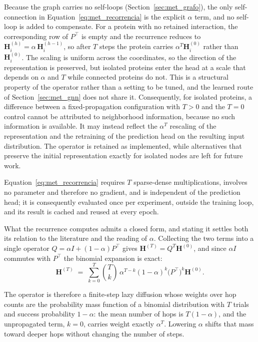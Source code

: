 \documentclass[Ingles]{ic-tese-v3}
\begin{document}
Because the graph carries no self-loops (Section~\ref{sec:met_grafo}), the only self-connection in
Equation~\eqref{eq:met_recorrencia} is the explicit $\alpha$ term, and no self-loop is added to
compensate. For a protein with no retained interaction, the corresponding row of $P^{\top}$ is empty
and the recurrence reduces to $\mathbf{H}^{(h)}_i = \alpha\, \mathbf{H}^{(h-1)}_i$, so after $T$
steps the protein carries $\alpha^{T}\mathbf{H}^{(0)}_i$ rather than $\mathbf{H}^{(0)}_i$. The
scaling is uniform across the coordinates, so the direction of the representation is preserved,
but isolated proteins enter the head at a scale that depends on $\alpha$ and $T$ while connected
proteins do not. This is a structural property of the operator rather than a setting to be tuned,
and the learned route of Section~\ref{sec:met_gnn} does not share it. Consequently, for isolated proteins, a difference between a fixed-propagation configuration with $T > 0$ and the $T = 0$ control cannot be attributed to neighborhood information, because no such information is available. It may instead reflect the $\alpha^{T}$ rescaling of the representation and the retraining of the prediction head on the resulting input distribution. The operator is retained as implemented, while alternatives that preserve the initial representation exactly for isolated nodes are left for future work.


Equation~\eqref{eq:met_recorrencia} requires $T$ sparse-dense multiplications, involves no
parameter and therefore no gradient, and is independent of the prediction head; it is consequently
evaluated once per experiment, outside the training loop, and its result is cached and reused at
every epoch.

What the recurrence computes admits a closed form, and stating it settles both its relation to the
literature and the reading of $\alpha$. Collecting the two terms into a single operator
$Q = \alpha I + (1-\alpha) P^{\top}$ gives $\mathbf{H}^{(T)} = Q^{T} \mathbf{H}^{(0)}$, and since
$\alpha I$ commutes with $P^{\top}$ the binomial expansion is exact:
\begin{equation}
  \mathbf{H}^{(T)} \;=\; \sum_{k=0}^{T} \binom{T}{k}\, \alpha^{T-k} (1-\alpha)^{k}
  \bigl(P^{\top}\bigr)^{k} \mathbf{H}^{(0)}.
  \label{eq:met_binomial}
\end{equation}

The operator is therefore a finite-step lazy diffusion whose weights over hop counts are the
probability mass function of a binomial distribution with $T$ trials and success probability
$1-\alpha$: the mean number of hops is $T(1-\alpha)$, and the unpropagated term, $k=0$, carries
weight exactly $\alpha^{T}$. Lowering $\alpha$ shifts that mass toward deeper hops without changing
the number of steps.
\end{document}
